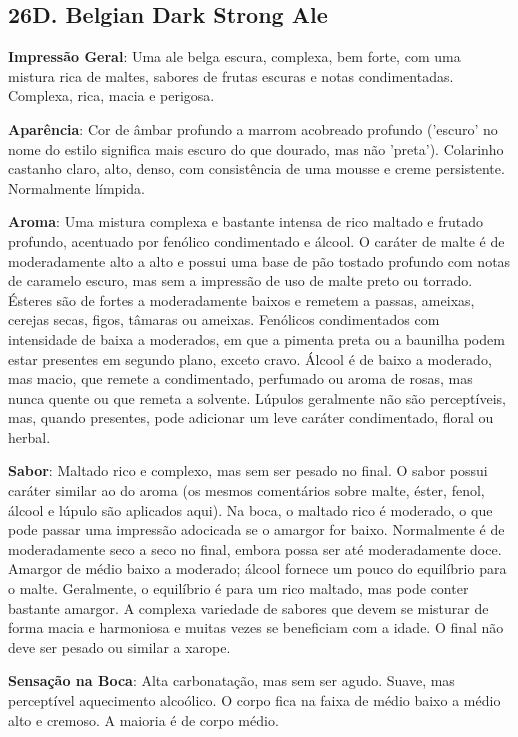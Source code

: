 \subsection*{26D. Belgian Dark Strong Ale}
\textbf{Impressão Geral}: Uma ale belga escura, complexa, bem forte, com uma mistura rica de maltes, sabores de frutas escuras e notas condimentadas. Complexa, rica, macia e perigosa.

\textbf{Aparência}: Cor de âmbar profundo a marrom acobreado profundo ('escuro' no nome do estilo significa mais escuro do que dourado, mas não 'preta'). Colarinho castanho claro, alto, denso, com consistência de uma mousse e creme persistente. Normalmente límpida.

\textbf{Aroma}: Uma mistura complexa e bastante intensa de rico maltado e frutado profundo, acentuado por fenólico condimentado e álcool. O caráter de malte é de moderadamente alto a alto e possui uma base de pão tostado profundo com notas de caramelo escuro, mas sem a impressão de uso de malte preto ou torrado. Ésteres são de fortes a moderadamente baixos e remetem a passas, ameixas, cerejas secas, figos, tâmaras ou ameixas. Fenólicos condimentados com intensidade de baixa a moderados, em que a pimenta preta ou a baunilha podem estar presentes em segundo plano, exceto cravo. Álcool é de baixo a moderado, mas macio, que remete a condimentado, perfumado ou aroma de rosas, mas nunca quente ou que remeta a solvente. Lúpulos geralmente não são perceptíveis, mas, quando presentes, pode adicionar um leve caráter condimentado, floral ou herbal.

\textbf{Sabor}: Maltado rico e complexo, mas sem ser pesado no final. O sabor possui caráter similar ao do aroma (os mesmos comentários sobre malte, éster, fenol, álcool e lúpulo são aplicados aqui). Na boca, o maltado rico é moderado, o que pode passar uma impressão adocicada se o amargor for baixo. Normalmente é de moderadamente seco a seco no final, embora possa ser até moderadamente doce. Amargor de médio baixo a moderado; álcool fornece um pouco do equilíbrio para o malte. Geralmente, o equilíbrio é para um rico maltado, mas pode conter bastante amargor. A complexa variedade de sabores que devem se misturar de forma macia e harmoniosa e muitas vezes se beneficiam com a idade. O final não deve ser pesado ou similar a xarope.

\textbf{Sensação na Boca}: Alta carbonatação, mas sem ser agudo. Suave, mas perceptível aquecimento alcoólico. O corpo fica na faixa de médio baixo a médio alto e cremoso. A maioria é de corpo médio.

